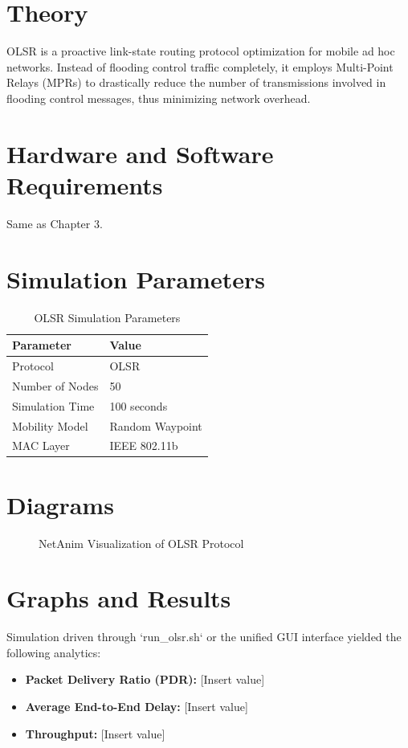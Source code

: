 \documentclass[12pt,a4paper]{report}
\begin{document}
\section{Theory}
OLSR is a proactive link-state routing protocol optimization for mobile ad hoc networks. Instead of flooding control traffic completely, it employs Multi-Point Relays (MPRs) to drastically reduce the number of transmissions involved in flooding control messages, thus minimizing network overhead.

\section{Hardware and Software Requirements}
Same as Chapter 3.

\section{Simulation Parameters}
\begin{table}[H]
    \centering
    \caption{OLSR Simulation Parameters}
    \begin{tabular}{@{}ll@{}}
    \toprule
    \textbf{Parameter} & \textbf{Value} \\ \midrule
    Protocol & OLSR \\
    Number of Nodes & 50 \\
    Simulation Time & 100 seconds \\
    Mobility Model & Random Waypoint \\
    MAC Layer & IEEE 802.11b \\ \bottomrule
    \end{tabular}
\end{table}

\section{Diagrams}
\begin{figure}[H]
    \centering
    \caption{NetAnim Visualization of OLSR Protocol}
\end{figure}

\section{Graphs and Results}
Simulation driven through `run\_olsr.sh` or the unified GUI interface yielded the following analytics:
\begin{itemize}
    \item \textbf{Packet Delivery Ratio (PDR):} [Insert value]
    \item \textbf{Average End-to-End Delay:} [Insert value]
    \item \textbf{Throughput:} [Insert value]
\end{itemize}
\end{document}
